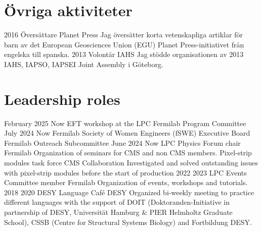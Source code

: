 \ifswedish
  \section{Övriga aktiviteter}
    \position
      {2016 \textemdash{}}
      {Översättare}
      {Planet Press}
      {Jag översätter korta vetenskapliga artiklar för barn av det European Geosciences Union (EGU) Planet Press-initiativet från engelska till spanska.}
    \position
      {2013}
      {Volontär}
      {IAHS}
      {Jag stödde organisationen av 2013 IAHS, IAPSO, IAPSEI Joint Assembly i Göteborg.}
\else
  \section{Leadership roles}
  	\position
      {February 2025 \textemdash{} Now} 
      {EFT workshop at the LPC}
      {Fermilab}
      {Program Committee}
     \position
      {July 2024 \textemdash{} Now} 
      {Fermilab Society of Women Engineers (fSWE) Executive Board}
      {Fermilab}
      {Outreach Subcommittee}
     \position
      {June 2024 \textemdash{} Now} 
      {LPC Physics Forum chair}
      {Fermilab}
      {Organization of seminars for CMS and non CMS members.}
      {Pixel-strip modules task force}
      {CMS Collaboration}
      {Investigated and solved outstanding issues with pixel-strip modules before the start of production}
     \position
      {2022 \textemdash{} 2023} 
      {LPC Events Committee member}
      {Fermilab}
      {Organization of events, workshops and tutorials.}
    \position
      {2018 \textemdash{} 2020} 
      {DESY Language Café}
      {DESY}
      {Organized bi-weekly meeting to practice different languages with the support of DOIT (Doktoranden-Initiative in partnership of DESY, Universität Hamburg \&  PIER Helmholtz Graduate School), CSSB (Centre for Structural Systems Biology) and Fortbildung DESY.}
\fi
